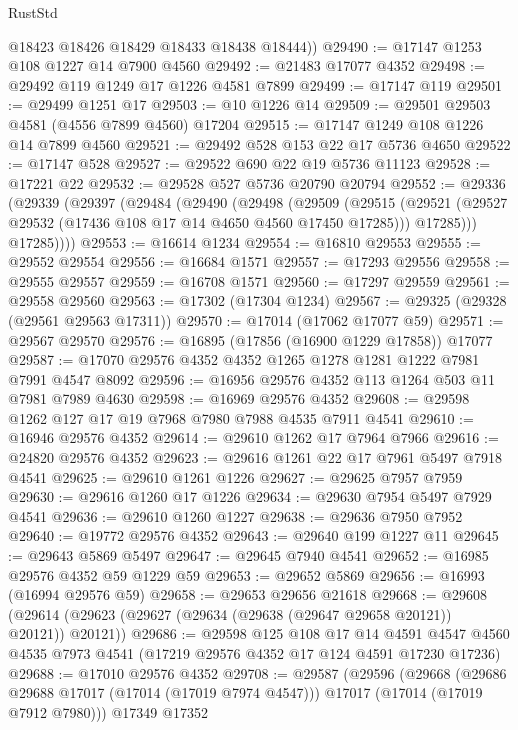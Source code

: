 \begin{lexlean}{RustStd}
\begin{coremodule}
{\begin{coremodule}
{{{{{{{{{{{{{{{{{{{{{{{{{{{{{{{{{{{{{{{{{{{{{{{{{{{{{{{        @18423
        @18426
        @18429
        @18433
        @18438
        @18444))
@29490 := @17147 @1253 @108 @1227 @14 @7900 @4560
@29492 := @21483 @17077 @4352
@29498 := @29492 @119 @1249 @17 @1226 @4581 @7899
@29499 := @17147 @119
@29501 := @29499 @1251 @17
@29503 := @10 @1226 @14
@29509 := @29501 @29503 @4581 (@4556 @7899 @4560) @17204
@29515 := @17147 @1249 @108 @1226 @14 @7899 @4560
@29521 := @29492 @528 @153 @22 @17 @5736 @4650
@29522 := @17147 @528
@29527 := @29522 @690 @22 @19 @5736 @11123
@29528 := @17221 @22
@29532 := @29528 @527 @5736 @20790 @20794
@29552 := @29336
    (@29339
      (@29397
        (@29484
          (@29490
            (@29498
              (@29509
                (@29515
                  (@29521 (@29527 @29532 (@17436 @108 @17 @14 @4650 @4560 @17450 @17285)))
                  @17285)))
            @17285))))
@29553 := @16614 @1234
@29554 := @16810 @29553
@29555 := @29552 @29554
@29556 := @16684 @1571
@29557 := @17293 @29556
@29558 := @29555 @29557
@29559 := @16708 @1571
@29560 := @17297 @29559
@29561 := @29558 @29560
@29563 := @17302 (@17304 @1234)
@29567 := @29325 (@29328 (@29561 @29563 @17311))
@29570 := @17014 (@17062 @17077 @59)
@29571 := @29567 @29570
@29576 := @16895 (@17856 (@16900 @1229 @17858)) @17077
@29587 := @17070 @29576 @4352 @4352 @1265 @1278 @1281 @1222 @7981 @7991 @4547 @8092
@29596 := @16956 @29576 @4352 @113 @1264 @503 @11 @7981 @7989 @4630
@29598 := @16969 @29576 @4352
@29608 := @29598 @1262 @127 @17 @19 @7968 @7980 @7988 @4535 @7911 @4541
@29610 := @16946 @29576 @4352
@29614 := @29610 @1262 @17 @7964 @7966
@29616 := @24820 @29576 @4352
@29623 := @29616 @1261 @22 @17 @7961 @5497 @7918 @4541
@29625 := @29610 @1261 @1226
@29627 := @29625 @7957 @7959
@29630 := @29616 @1260 @17 @1226
@29634 := @29630 @7954 @5497 @7929 @4541
@29636 := @29610 @1260 @1227
@29638 := @29636 @7950 @7952
@29640 := @19772 @29576 @4352
@29643 := @29640 @199 @1227 @11
@29645 := @29643 @5869 @5497
@29647 := @29645 @7940 @4541
@29652 := @16985 @29576 @4352 @59 @1229 @59
@29653 := @29652 @5869
@29656 := @16993 (@16994 @29576 @59)
@29658 := @29653 @29656 @21618
@29668 := @29608 (@29614 (@29623 (@29627 (@29634 (@29638 (@29647 @29658 @20121)) @20121)) @20121))
@29686 := @29598
    @125
    @108
    @17
    @14
    @4591
    @4547
    @4560
    @4535
    @7973
    @4541
    (@17219 @29576 @4352 @17 @124 @4591 @17230 @17236)
@29688 := @17010 @29576 @4352
@29708 := @29587
    (@29596
      (@29668
        (@29686 @29688 @17017 (@17014 (@17019 @7974 @4547)))
        @17017
        (@17014 (@17019 @7912 @7980)))
      @17349
      @17352
}}}}}}}}}}}}}}}}}}}}}}}}}}}}}}}}}}}}}}}}}}}}}}}}}}}}}}}
\end{coremodule}}
\end{coremodule}
\end{lexlean}
